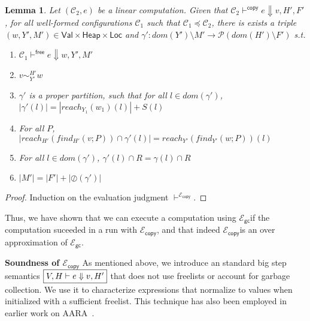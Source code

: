\documentclass{easychair}
\newcommand{\ms}[1]{\ensuremath{\mathsf{#1}}}
\newcommand{\veq}[4]{#3 \sim^{#1}_{#2} #4}
\newcommand{\oh}[1]{\oslash(#1)}
\newcommand{\gcSem}{\ensuremath{\mathcal{E}_{\ms{gc}}}}
\newcommand{\copySem}{\ensuremath{\mathcal{E}_{\ms{copy}}}}
\newtheorem{lemma}[theorem]{Lemma}
\theoremstyle{definition}
\begin{document}
\begin{lemma}
	Let $(\mathcal{C}_2,e)$ be a linear computation. Given that 
	$\mathcal{C}_2 \vdash^{\mathsf{copy}} e \Downarrow v,H',F'$,
	for all well-formed configurations $\mathcal{C}_1$ such that $\mathcal{C}_1 \preceq \mathcal{C}_2$,
there is exists a triple
$(w,Y',M') \in \ms{Val} \times \ms{Heap} \times \ms{Loc}$ and 
	$\gamma' : dom(Y') \setminus M' \to \mathcal{P}(dom(H') \setminus F')$ s.t.
	\begin{enumerate}
			\item $\mathcal{C}_1 \vdash^{\mathsf{free}} e \Downarrow w,Y',M'$
			\item $\veq{H'}{Y'}{v}{w}$
			\item $\gamma'$ is a proper partition, such that for all $l \in dom(\gamma')$, 
				$|\gamma'(l)| = |reach_{Y_1}(w_1)(l)| + S(l)$
			\item For all $P$, $|reach_{H'}(find_{H'}(v;P)) \cap \gamma'(l)| = 
				reach_{Y'}(find_{Y'}(w;P))(l)$
			\item For all $l \in dom(\gamma')$, $\gamma'(l) \cap R = \gamma(l) \cap R$
			\item $|M'| = |F'| + |\oh{\gamma'}|$
	\end{enumerate}
\end{lemma}

\begin{proof}
	Induction on the evaluation judgment $\vdash^{\copySem{}}$.
\end{proof}

Thus, we have shown that we can execute a computation using 
\gcSem if the computation suceeded in a run with \copySem, and that indeed 
\copySem is an over approximation of \gcSem.

\textbf{Soundness of $\copySem$}
\label{sect:soundcopy}
As mentioned above, we introduce an standard big step semantics $\fbox{$V,H \vdash e \Downarrow v,H'$}$
that does not use freelists or account for garbage collection. We use
it to characterize expressions that normalize to values when initialized with a sufficient 
freelist.  This technique has also been employed in earlier work on AARA~\cite{Hofmann:2003:SPH:604131.604148}.
\end{document}
